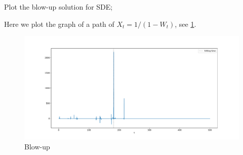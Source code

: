     \problem
    \begin{question}
        Plot the blow-up solution for SDE; 
    \end{question}
    Here we plot the graph of a path of $X_t=1/(1-W_t)$, see \cref{fig:blowup}.
    \begin{figure}[h]
        \centering
        \includegraphics[width=\textwidth]{blowup}
        \caption{Blow-up}
        \label{fig:blowup}
    \end{figure}

